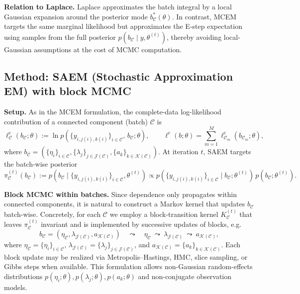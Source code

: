 \documentclass[12pt]{article}
\begin{document}
\textbf{Relation to Laplace.}
Laplace approximates the batch integral by a local Gaussian expansion around the posterior mode \(b_{\mathcal{C}}^*(\theta)\). In contrast, MCEM targets the same marginal likelihood but approximates the E-step expectation using samples from the full posterior \(p(b_{\mathcal{C}}\mid y,\theta^{(t)})\), thereby avoiding local-Gaussian assumptions at the cost of MCMC computation.


\subsection*{Method: SAEM (Stochastic Approximation EM) with block MCMC}

\textbf{Setup.}
As in the MCEM formulation, the complete-data log-likelihood contribution of a connected component (batch) \(\mathcal{C}\) is
\[
\ell_{\mathcal{C}}^{\mathrm{c}}(b_{\mathcal{C}};\theta)
:=
\ln p\!\left(\{y_{i,j(i),k(i)}\}_{i\in\mathcal{C}},\, b_{\mathcal{C}};\theta\right),
\qquad
\ell^{\mathrm{c}}(b;\theta)=\sum_{m=1}^M \ell_{\mathcal{C}_m}^{\mathrm{c}}(b_{\mathcal{C}_m};\theta),
\]
where \(b_{\mathcal{C}}=(\{\eta_i\}_{i\in\mathcal{C}},\{\lambda_j\}_{j\in\mathcal{J}(\mathcal{C})},\{a_k\}_{k\in\mathcal{K}(\mathcal{C})})\).
At iteration \(t\), SAEM targets the batch-wise posterior
\[
\pi_{\mathcal{C}}^{(t)}(b_{\mathcal{C}})
:=
p\!\left(b_{\mathcal{C}} \mid \{y_{i,j(i),k(i)}\}_{i\in\mathcal{C}},\theta^{(t)}\right)
\propto
p\!\left(\{y_{i,j(i),k(i)}\}_{i\in\mathcal{C}} \mid b_{\mathcal{C}};\theta^{(t)}\right)\,
p\!\left(b_{\mathcal{C}};\theta^{(t)}\right).
\]

\textbf{Block MCMC within batches.}
Since dependence only propagates within connected components, it is natural to construct a Markov kernel that updates \(b_{\mathcal{C}}\) batch-wise. Concretely, for each \(\mathcal{C}\) we employ a block-transition kernel \(K_{\mathcal{C}}^{(t)}\) that leaves \(\pi_{\mathcal{C}}^{(t)}\) invariant and is implemented by successive updates of blocks, e.g.
\[
b_{\mathcal{C}}=(\eta_{\mathcal{C}},\lambda_{\mathcal{J}(\mathcal{C})},a_{\mathcal{K}(\mathcal{C})})
\quad\leadsto\quad
\eta_{\mathcal{C}} \ \leadsto\ \lambda_{\mathcal{J}(\mathcal{C})}\ \leadsto\ a_{\mathcal{K}(\mathcal{C})},
\]
where \(\eta_{\mathcal{C}}=\{\eta_i\}_{i\in\mathcal{C}}\), \(\lambda_{\mathcal{J}(\mathcal{C})}=\{\lambda_j\}_{j\in\mathcal{J}(\mathcal{C})}\), and \(a_{\mathcal{K}(\mathcal{C})}=\{a_k\}_{k\in\mathcal{K}(\mathcal{C})}\).
Each block update may be realized via Metropolis--Hastings, HMC, slice sampling, or Gibbs steps when available. This formulation allows non-Gaussian random-effects distributions \(p(\eta_i;\theta),p(\lambda_j;\theta),p(a_k;\theta)\) and non-conjugate observation models.
\end{document}
